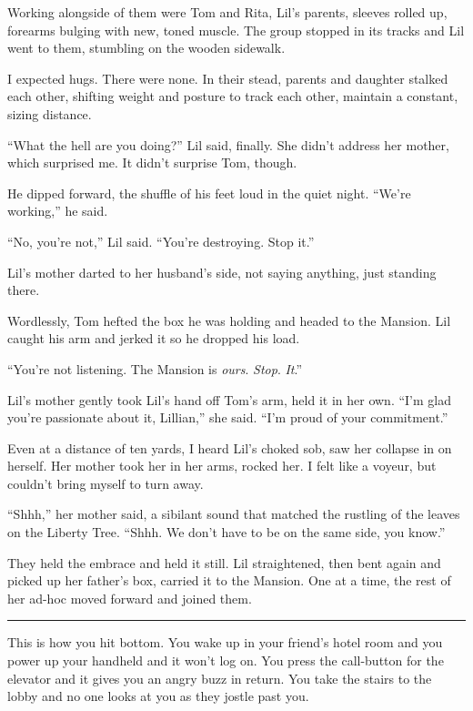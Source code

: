 Working alongside of them were Tom and Rita, Lil's parents, sleeves
rolled up, forearms bulging with new, toned muscle. The group
stopped in its tracks and Lil went to them, stumbling on the wooden
sidewalk.

I expected hugs. There were none. In their stead, parents and
daughter stalked each other, shifting weight and posture to track
each other, maintain a constant, sizing distance.

“What the hell are you doing?” Lil said, finally. She didn't
address her mother, which surprised me. It didn't surprise Tom,
though.

He dipped forward, the shuffle of his feet loud in the quiet night.
“We're working,” he said.

“No, you're not,” Lil said. “You're destroying. Stop it.”

Lil's mother darted to her husband's side, not saying anything,
just standing there.

Wordlessly, Tom hefted the box he was holding and headed to the
Mansion. Lil caught his arm and jerked it so he dropped his load.

“You're not listening. The Mansion is \emph{ours}. \emph{Stop}.
\emph{It}.”

Lil's mother gently took Lil's hand off Tom's arm, held it in her
own. “I'm glad you're passionate about it, Lillian,” she said. “I'm
proud of your commitment.”

Even at a distance of ten yards, I heard Lil's choked sob, saw her
collapse in on herself. Her mother took her in her arms, rocked
her. I felt like a voyeur, but couldn't bring myself to turn away.

“Shhh,” her mother said, a sibilant sound that matched the rustling
of the leaves on the Liberty Tree. “Shhh. We don't have to be on
the same side, you know.”

They held the embrace and held it still. Lil straightened, then
bent again and picked up her father's box, carried it to the
Mansion. One at a time, the rest of her ad-hoc moved forward and
joined them.

\begin{center}\rule{3in}{0.4pt}\end{center}

This is how you hit bottom. You wake up in your friend's hotel room
and you power up your handheld and it won't log on. You press the
call-button for the elevator and it gives you an angry buzz in
return. You take the stairs to the lobby and no one looks at you as
they jostle past you.


